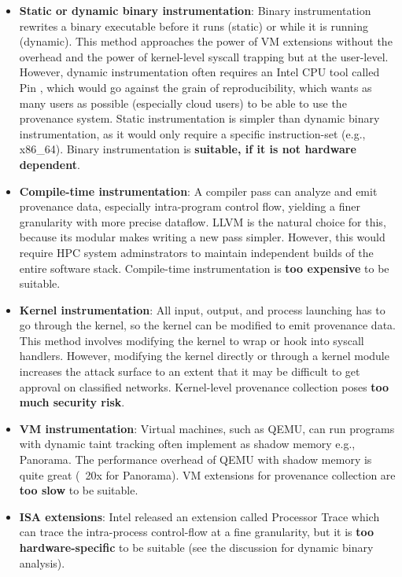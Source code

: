 \begin{itemize}
\item \textbf{Static or dynamic binary instrumentation}:
Binary instrumentation rewrites a binary executable before it runs (static) or while it is running (dynamic).
This method approaches the power of VM extensions without the overhead and the power of kernel-level syscall trapping but at the user-level.
However, dynamic instrumentation often requires an Intel CPU tool called Pin \cite{luk_pin_2005}, which would go against the grain of reproducibility, which wants as many users as possible (especially cloud users) to be able to use the provenance system.
Static instrumentation is simpler than dynamic binary instrumentation, as it would only require a specific instruction-set (e.g., x86\_64).
Binary instrumentation is \textbf{suitable, if it is not hardware dependent}.

\item \textbf{Compile-time instrumentation}:
A compiler pass can analyze and emit provenance data, especially intra-program control flow, yielding a finer granularity with more precise dataflow.
LLVM is the natural choice for this, because its modular makes writing a new pass simpler.
However, this would require HPC system adminstrators to maintain independent builds of the entire software stack.
Compile-time instrumentation is \textbf{too expensive} to be suitable.

\item \textbf{Kernel instrumentation}:
All input, output, and process launching has to go through the kernel, so the kernel can be modified to emit provenance data.
This method involves modifying the kernel to wrap or hook into syscall handlers.
However, modifying the kernel directly or through a kernel module increases the attack surface to an extent that it may be difficult to get approval on classified networks.
Kernel-level provenance collection poses \textbf{too much security risk}.

\item \textbf{VM instrumentation}:
Virtual machines, such as QEMU, can run programs with dynamic taint tracking often implement as shadow memory e.g., Panorama\cite{yin_panorama_2007}.
The performance overhead of QEMU with shadow memory is quite great (~20x for Panorama).
VM extensions for provenance collection are \textbf{too slow} to be suitable.

\item \textbf{ISA extensions}:
Intel released an extension called Processor Trace \cite{kleen_intel_2015} which can trace the intra-process control-flow at a fine granularity, but it is \textbf{too hardware-specific} to be suitable (see the discussion for dynamic binary analysis).

\end{itemize}

